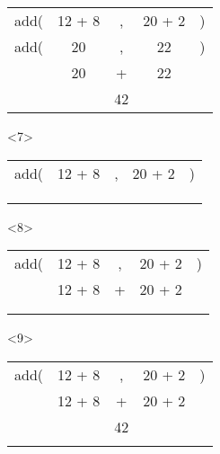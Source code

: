 \documentclass[17pt]{beamer}
\renewcommand{\(}[1]{\begin{columns}[#1]}
\renewcommand{\)}{\end{columns}}
\newcommand{\<}[1]{\begin{column}{#1}}
\renewcommand{\>}{\end{column}}
\begin{document}
\begin{frame}
\begin{minipage}[t][.7\textheight]{\textwidth}
\begin{center}
\begin{onlyenv}
      \begin{tabular}{ c c c c c }
        \\ add( & 12 + 8 & ,  & 20 + 2 & )
        \\ add( & 20     & ,  & 22     & )
        \\      & 20     & +  & 22     &
        \\      &        & 42 &        &
      \end{tabular}
    \end{onlyenv}
    \begin{onlyenv}<7>
      \begin{tabular}{ c c c c c }
        \\ add( & 12 + 8 & ,              & 20 + 2 & )
        \\      &        &                &        &
        \\      &        & \phantom{42}   &        &
        \\      &        &                &        &
      \end{tabular}
    \end{onlyenv}
    \begin{onlyenv}<8>
      \begin{tabular}{ c c c c c }
        \\ add( & 12 + 8 & ,              & 20 + 2 & )
        \\      & 12 + 8 & +              & 20 + 2 &
        \\      &        & \phantom{42}   &        &
        \\      &        &                &        &
      \end{tabular}
    \end{onlyenv}
    \begin{onlyenv}<9>
      \begin{tabular}{ c c c c c }
        \\ add( & 12 + 8 & ,  & 20 + 2 & )
        \\      & 12 + 8 & +  & 20 + 2 &
        \\      &        & 42 &        &
        \\      &        &    &        &
      \end{tabular}
    \end{onlyenv}
  \end{center}
  \end{minipage}
\end{frame}
\end{document}
